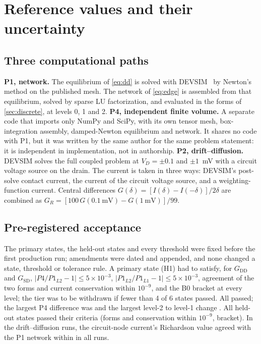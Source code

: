 \documentclass[11pt]{article}
\newcommand{\G}[1]{G_{\mathrm{#1}}}
\begin{document}
\section{Reference values and their uncertainty}\label{sec:reference}

\subsection{Three computational paths}
\textbf{P1, network.} The equilibrium of \cref{eq:dd} is solved with DEVSIM~\cite{Sanchez2022} by Newton's method on the
published mesh. The network of \cref{eq:edge} is assembled from that equilibrium, solved by sparse LU factorization, and
evaluated in the forms of \cref{sec:discrete}, at levels 0, 1 and 2.
\textbf{P4, independent finite volume.} A separate code that imports only NumPy and SciPy, with its own tensor mesh,
box-integration assembly, damped-Newton equilibrium and network. It shares no code with P1, but it was written by the
same author for the same problem statement: it is independent in implementation, not in authorship.
\textbf{P2, drift--diffusion.} DEVSIM solves the full coupled problem at $V_D = \pm0.1$ and $\pm1$~mV with a circuit voltage
source on the drain. The current is taken in three ways: DEVSIM's post-solve contact current, the current of the circuit
voltage source, and a weighting-function current. Central differences $G(\delta) = [I(\delta) - I(-\delta)]/2\delta$ are
combined as $G_R = [100\,G(0.1~\mathrm{mV}) - G(1~\mathrm{mV})]/99$.

\subsection{Pre-registered acceptance}
The primary states, the held-out states and every threshold were fixed before the first production run; amendments
were dated and appended, and none changed a state, threshold or tolerance rule. A primary state (H1) had to satisfy,
for $\G{DD}$ and $\G{SD}$, $|P4/P1_{L2} - 1| \le 5\times10^{-3}$, $|P1_{L2}/P1_{L1} - 1| \le 5\times10^{-3}$, agreement of
the two forms and current conservation within $10^{-9}$, and the B0 bracket at every level; the tier was to be withdrawn
if fewer than 4 of 6 states passed. All \HonePass{} passed; the largest P4 difference was \maxPfour{} and the largest
level-2 to level-1 change \maxRefine{}. All \HtwoPass{} held-out states passed their criteria (forms and conservation
within $10^{-9}$, bracket). In the drift--diffusion runs, the circuit-node current's Richardson value agreed with the P1
network within \ecircWorst{} in all \nPtwoRuns{} runs.
\end{document}
